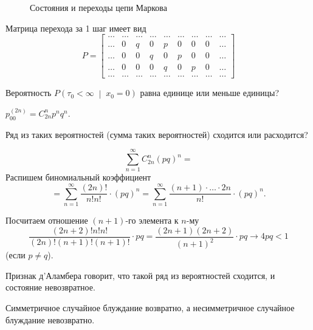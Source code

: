 \begin{figure}[h]
  \centering
  
  \caption{Состояния и переходы цепи Маркова}
  \label{fig:164}
\end{figure}

Матрица перехода за 1 шаг имеет вид
\begin{equation*}
  P =
  \begin{bmatrix}
    \dotsc & \dotsc & \dotsc & \dotsc & \dotsc & \dotsc & \dotsc & \dotsc & \dotsc \\
    \dotsc & 0      & q      & 0      & p      & 0      & 0      & 0      & \dotsc \\
    \dotsc & 0      & 0      & q      & 0      & p      & 0      & 0      & \dotsc \\
    \dotsc & 0      & 0      & 0      & q      & 0      & p      & 0      & \dotsc \\
    \dotsc & \dotsc & \dotsc & \dotsc & \dotsc & \dotsc & \dotsc & \dotsc & \dotsc
  \end{bmatrix}
\end{equation*}

Вероятность $P \left( \tau_0 < \infty \; \middle| \; x_0 = 0 \right) $
равна единице или меньше единицы?

$p_{00}^{ \left( 2n \right) } = C_{2n}^n p^n q^n$.

Ряд из таких вероятностей (сумма таких вероятностей) сходится или расходится?

\begin{equation*}
  \sum \limits_{n = 1}^{ \infty } C_{2n}^n \left( pq \right)^n =
\end{equation*}
Распишем биномиальный коэффициент
\begin{equation*}
  = \sum \limits_{n = 1}^{ \infty }
    \frac{ \left( 2n \right)!}{n! n!} \cdot \left( pq \right)^n =
  \sum \limits_{n = 1}^{ \infty }
    \frac{ \left( n + 1 \right) \cdot \dotsc \cdot 2n}{n!} \cdot
    \left( pq \right)^n.
\end{equation*}

Посчитаем отношение $ \left( n + 1 \right) $-го элемента к $n$-му
\begin{equation*}
  \frac{ \left( 2n + 2 \right)! n! n!}{ \left( 2n \right)! \left( n + 1 \right)! \left( n + 1 \right)!} \cdot
  pq =
  \frac{ \left( 2n + 1 \right) \left( 2n + 2 \right) }{ \left( n + 1 \right)^2} \cdot
  pq \to
  4pq <
  1
\end{equation*}
(если $p \neq q$).

Признак д'Аламбера говорит, что такой ряд из вероятностей сходится,
и состояние невозвратное.

Симметричное случайное блуждание возвратно,
а несимметричное случайное блуждание невозвратно.
